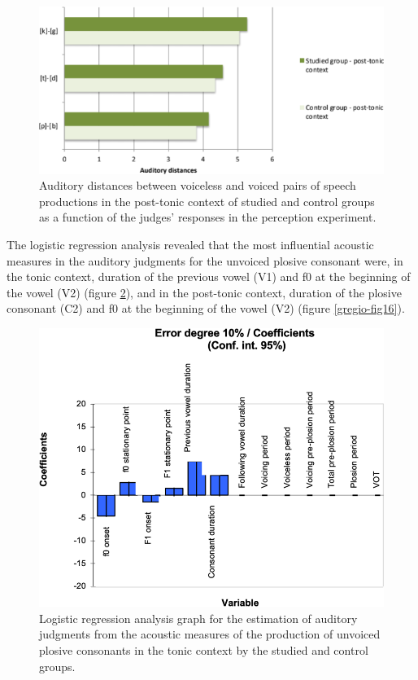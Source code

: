 \begin{figure}
\centering
\includegraphics[width=\linewidth]{imgs/gregio-image14.png}
\caption{Auditory distances between voiceless and voiced pairs of speech productions in the post-tonic context of studied and control groups as a function of the judges' responses in the perception experiment.} 
\label{gregio-fig14}
\end{figure}



The logistic regression analysis revealed that the most influential acoustic
measures in the auditory judgments for the unvoiced plosive consonant were, in
the tonic context, duration of the previous vowel (V1) and f0 at the beginning
of the vowel (V2) (figure \ref{gregio-fig15}), and in the post-tonic context, duration of the
plosive consonant (C2) and f0 at the beginning of the vowel (V2) (figure \ref{gregio-fig16}).

\begin{figure}
\centering
\includegraphics[width=0.9\linewidth]{imgs/gregio-image15.png}
\caption{Logistic regression analysis graph for the estimation of auditory judgments from the acoustic measures of the production of unvoiced plosive consonants in the tonic context by the studied and control groups.} 
\label{gregio-fig15}
\end{figure}

